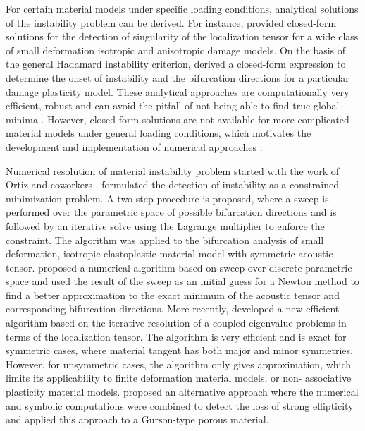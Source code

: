 \documentclass[12pt]{article}
\numberwithin{equation}{section}
\begin{document}
For certain material models under specific loading conditions, 
analytical solutions of the instability problem can be derived. For 
instance, \citet{Oliver.Huespe:2004} provided closed-form solutions 
for the detection of singularity of the localization tensor for a wide 
class of small deformation isotropic and anisotropic damage models. On 
the basis of the general Hadamard instability criterion, 
\citet{Xue.Belytschko:2010} derived a closed-form expression to 
determine the onset of instability and the bifurcation directions for 
a particular damage plasticity model. These analytical approaches are 
computationally very efficient, robust and can avoid the pitfall of 
not being able to find true global minima \cite{Oliver.etal:2010}. 
However, closed-form solutions are not available for more complicated 
material models under general loading conditions, which motivates the 
development and implementation of numerical approaches 
\cite{Mosler:2005}. 

Numerical resolution of material instability problem started with the 
work of Ortiz and coworkers \cite{Ortiz:1987, Ortiz.etal:1987}. 
\citet{Ortiz.etal:1987} formulated the detection of instability as a 
constrained minimization problem. A two-step procedure is proposed, 
where a sweep is performed over the parametric space of possible 
bifurcation directions and is followed by an iterative solve using the 
Lagrange multiplier to enforce the constraint. The algorithm was 
applied to the bifurcation analysis of small deformation, isotropic 
elastoplastic material model with symmetric acoustic tensor. 
\citet{Mosler:2005} proposed a numerical algorithm based on sweep over 
discrete parametric space and used the result of the sweep as an 
initial guess for a Newton method to find a better approximation to 
the exact minimum of the acoustic tensor and corresponding bifurcation 
directions. More recently, \citet{Oliver.etal:2010} developed a new 
efficient algorithm based on the iterative resolution of a coupled 
eigenvalue problems in terms of the localization tensor. The algorithm 
is very efficient and is exact for symmetric cases, where material 
tangent has both major and minor symmetries. However, for unsymmetric 
cases, the algorithm only gives approximation, which limits its 
applicability to finite deformation material models, or non-
associative plasticity material models. \citet{Boussaa-Aravas:2001} 
proposed an alternative approach where the numerical and symbolic 
computations were combined to detect the loss of strong ellipticity 
and applied this approach to a Gurson-type porous material.
\end{document}
